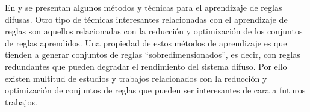 En \cite{Alcala99} y \cite{Serrurier2007} se presentan algunos métodos y técnicas para el aprendizaje de reglas difusas. Otro tipo de técnicas interesantes relacionadas con el aprendizaje de reglas son aquellos relacionadas con la reducción y optimización de los conjuntos de reglas aprendidos. Una propiedad de estos métodos de aprendizaje es que tienden a generar conjuntos de reglas ``sobredimensionados'', es decir, con reglas redundantes que pueden degradar el rendimiento del sistema difuso. Por ello existen multitud de estudios y trabajos relacionados con la reducción y optimización de conjuntos de reglas que pueden ser interesantes de cara a futuros trabajos.